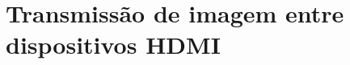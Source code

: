 \section{Transmissão de imagem entre dispositivos HDMI} \label{subsub:ap2planB}
%
%
%
%
%
%
%
%
%
%
%
%
%
%
%
%
%
%
%
%
%
%
%
%
%
%
%
%
%
%
%
%
%
%
%
